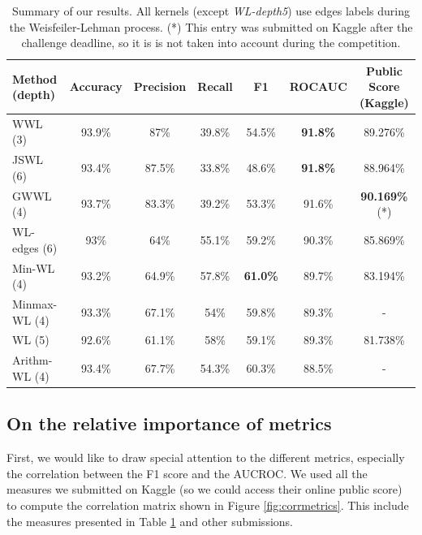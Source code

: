 \documentclass{IEEEtran}
\begin{document}
\begin{table}[h]
    \centering
    \begin{tabular}{l||cccc|c|c}
        Method (depth) & Accuracy & Precision & Recall & F1              & ROCAUC          & Public Score (Kaggle)  \\
        \hline
        WWL (3)        & 93.9\%   & 87\%      & 39.8\% & 54.5\%          & \textbf{91.8\%} & 89.276\%               \\
        JSWL (6)       & 93.4\%   & 87.5\%    & 33.8\% & 48.6\%          & \textbf{91.8\%} & 88.964\%               \\
        GWWL (4)       & 93.7\%   & 83.3\%    & 39.2\% & 53.3\%          & 91.6\%          & \textbf{90.169\%}  (*) \\
        WL-edges (6)   & 93\%     & 64\%      & 55.1\% & 59.2\%          & 90.3\%          & 85.869\%               \\
        Min-WL (4)     & 93.2\%   & 64.9\%    & 57.8\% & \textbf{61.0\%} & 89.7\%          & 83.194\%               \\
        Minmax-WL (4)  & 93.3\%   & 67.1\%    & 54\%   & 59.8\%          & 89.3\%          & -                      \\
        WL (5)         & 92.6\%   & 61.1\%    & 58\%   & 59.1\%          & 89.3\%          & 81.738\%               \\
        Arithm-WL (4)  & 93.4\%   & 67.7\%    & 54.3\% & 60.3\%          & 88.5\%          & -                      \\
    \end{tabular}
    \caption{Summary of our results. All kernels (except \emph{WL-depth5}) use edges labels during the Weisfeiler-Lehman process.
        (*) This entry was submitted on Kaggle after the challenge deadline, so it is is not taken into account during the competition.
    }
    \label{tab:summary}
\end{table}

\subsection{On the relative importance of metrics}
First, we would like to draw special attention to the different metrics,
especially the correlation between the F1 score and the AUCROC.
We used all the measures we submitted on Kaggle
(so we could access their online public score)
to compute the correlation matrix shown in Figure \ref{fig:corrmetrics}.
This include the measures presented in Table \ref{tab:summary} and
other submissions.
\end{document}
